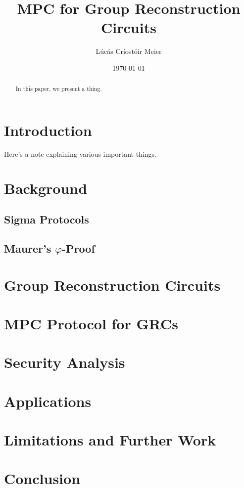 \documentclass[12pt]{article}
\date{\today}
\title{MPC for Group Reconstruction Circuits}
\author{Lúcás Críostóir Meier}
\begin{document}
\maketitle

\begin{abstract}
    In this paper, we present a thing.
\end{abstract}

\section{Introduction}

\begin{note}
    Here's a note explaining various important things.
\end{note}

\section{Background}

\subsection{Sigma Protocols}

\subsection{Maurer's $\varphi$-Proof}

\section{Group Reconstruction Circuits}

\section{MPC Protocol for GRCs}

\section{Security Analysis}

\section{Applications}

\section{Limitations and Further Work}

\section{Conclusion}


\footnotesize 
\end{document}
